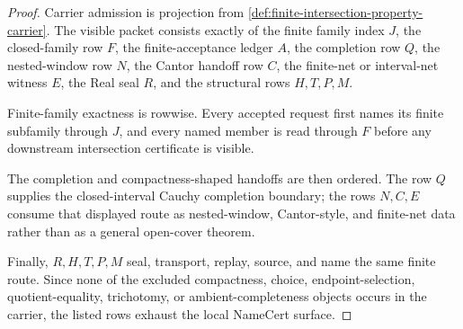 \begin{proof}
Carrier admission is projection from \autoref{def:finite-intersection-property-carrier}. The visible packet consists exactly of the finite family index $J$, the closed-family row $F$, the finite-acceptance ledger $A$, the completion row $Q$, the nested-window row $N$, the Cantor handoff row $C$, the finite-net or interval-net witness $E$, the Real seal $R$, and the structural rows $H,T,P,M$.

Finite-family exactness is rowwise. Every accepted request first names its finite subfamily through $J$, and every named member is read through $F$ before any downstream intersection certificate is visible.

The completion and compactness-shaped handoffs are then ordered. The row $Q$ supplies the closed-interval Cauchy completion boundary; the rows $N,C,E$ consume that displayed route as nested-window, Cantor-style, and finite-net data rather than as a general open-cover theorem.

Finally, $R,H,T,P,M$ seal, transport, replay, source, and name the same finite route. Since none of the excluded compactness, choice, endpoint-selection, quotient-equality, trichotomy, or ambient-completeness objects occurs in the carrier, the listed rows exhaust the local NameCert surface.
\end{proof}

